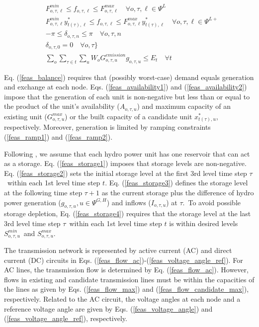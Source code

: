 \documentclass[final]{IEEEtran}
\begin{document}
\begin{align}
&\label{feas_flow_max}F_{o, \tau, \ell}^{min} \leq f_{o, \tau, \ell} \leq F_{o, \tau, \ell}^{max} \quad \forall o, \tau, \ell \in \Psi^L \\
&\label{feas_flow_candidate_max}F_{o, \tau, \ell}^{min} y_{t(\tau), \ell}^* \leq f_{o, \tau, \ell} \leq F_{o, \tau, \ell}^{max} y_{t(\tau), \ell}^* \quad \forall o, \tau, \ell \in \Psi^{L+} \\
&\label{feas_voltage_angle}-\pi \leq \delta_{o, \tau, n} \leq \pi \quad \forall o, \tau, n \\
&\label{feas_voltage_angle_ref}\delta_{o, \tau, 0} = 0 \quad \forall o, \tau \} \\
&\label{feas_emission_ub}\sum\limits_{o} \sum\limits_{\tau \in t} \sum\limits_{u} W_o G^{emission}_{o, \tau, u} g_{o, \tau, u} \leq E_{t} \quad \forall t
\end{align}

Eq. (\ref{feas_balance}) requires that (possibly worst-case) demand equals generation and exchange at each node. Eqs. (\ref{feas_availability1}) and (\ref{feas_availability2}) impose that the generation of each unit is non-negative but less than or equal to the product of the unit's availability ($A_{o, \tau, u}$) and maximum capacity of an existing unit ($G_{o, \tau, u}^{max}$) or the built capacity of a candidate unit $x_{t(\tau), u}^*$, respectively. Moreover, generation is limited by ramping constraints (\ref{feas_ramp1}) and (\ref{feas_ramp2}).

Following \cite{Debia}, we assume that each hydro power unit has one reservoir that can act as a storage. Eq. (\ref{feas_storage1}) imposes that storage levels are non-negative. Eq. (\ref{feas_storage2}) sets the initial storage level at the first 3rd level time step $\tau$ within each 1st level time step $t$. Eq. (\ref{feas_storage3}) defines the storage level at the following time step $\tau + 1$ as the current storage plus the difference of hydro power generation ($g_{o, \tau, u}, u \in \Psi^{G, H}$) and inflows ($I_{o, \tau, u}$) at $\tau$. To avoid possible storage depletion, Eq. (\ref{feas_storage4}) requires that the storage level at the last 3rd level time step $\tau$ within each 1st level time step $t$ is within desired levels $S^{min}_{o, \tau, u}$ and $S^{max}_{o, \tau, u}$.

The transmission network is represented by active current (AC) and direct current (DC) circuits in Eqs. (\ref{feas_flow_ac})-(\ref{feas_voltage_angle_ref}). For AC lines, the transmission flow is determined by Eq. (\ref{feas_flow_ac}). However, flows in existing and candidate transmission lines must be within the capacities of the lines as given by Eqs. (\ref{feas_flow_max}) and (\ref{feas_flow_candidate_max}), respectively. Related to the AC circuit, the voltage angles at each node and a reference voltage angle are given by Eqs. (\ref{feas_voltage_angle}) and (\ref{feas_voltage_angle_ref}), respectively.
\end{document}

